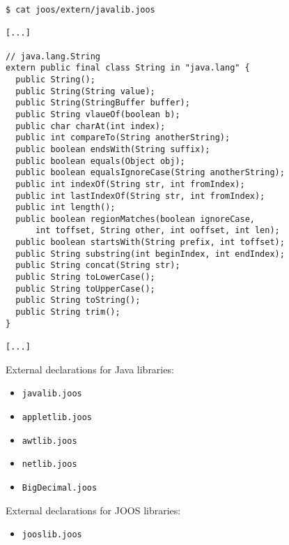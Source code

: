 \begin{slide*}
\begin{scriptsize}
\begin{verbatim}
$ cat joos/extern/javalib.joos

[...]

// java.lang.String
extern public final class String in "java.lang" {
  public String();
  public String(String value);
  public String(StringBuffer buffer);
  public String vlaueOf(boolean b);
  public char charAt(int index);
  public int compareTo(String anotherString);
  public boolean endsWith(String suffix);
  public boolean equals(Object obj);
  public boolean equalsIgnoreCase(String anotherString);
  public int indexOf(String str, int fromIndex);
  public int lastIndexOf(String str, int fromIndex);
  public int length();
  public boolean regionMatches(boolean ignoreCase,
      int toffset, String other, int ooffset, int len);
  public boolean startsWith(String prefix, int toffset);
  public String substring(int beginIndex, int endIndex);
  public String concat(String str);
  public String toLowerCase();
  public String toUpperCase();
  public String toString();
  public String trim();
}

[...]
\end{verbatim}
\end{scriptsize}
\vfil
\end{slide*}

\begin{slide*}
External declarations for Java libraries:
\begin{itemize}
\item {\tt javalib.joos}
\item {\tt appletlib.joos}
\item {\tt awtlib.joos}
\item {\tt netlib.joos}
\item {\tt BigDecimal.joos}
\end{itemize}

External declarations for JOOS libraries:
\begin{itemize}
\item {\tt jooslib.joos}
\end{itemize}
\vfil
\end{slide*}

